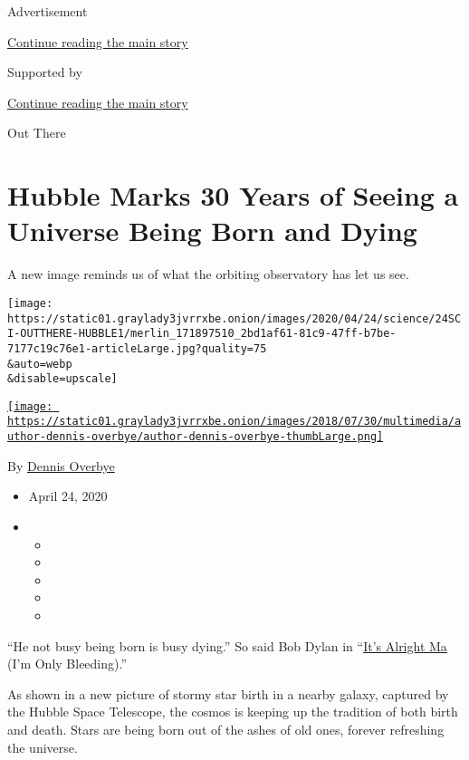 Advertisement

\protect\hyperlink{after-top}{Continue reading the main story}

Supported by

\protect\hyperlink{after-sponsor}{Continue reading the main story}

Out There

\hypertarget{hubble-marks-30-years-of-seeing-a-universe-being-born-and-dying}{%
\section{Hubble Marks 30 Years of Seeing a Universe Being Born and
Dying}\label{hubble-marks-30-years-of-seeing-a-universe-being-born-and-dying}}

A new image reminds us of what the orbiting observatory has let us see.

\texttt{[image: https://static01.graylady3jvrrxbe.onion/images/2020/04/24/science/24SCI-OUTTHERE-HUBBLE1/merlin\_171897510\_2bd1af61-81c9-47ff-b7be-7177c19c76e1-articleLarge.jpg?quality=75\\\&auto=webp\\\&disable=upscale]}

\href{https://www.nytimes3xbfgragh.onion/by/dennis-overbye}{\texttt{[image: https://static01.graylady3jvrrxbe.onion/images/2018/07/30/multimedia/author-dennis-overbye/author-dennis-overbye-thumbLarge.png]}}

By \href{https://www.nytimes3xbfgragh.onion/by/dennis-overbye}{Dennis
Overbye}

\begin{itemize}
\item
  April 24, 2020
\item
  \begin{itemize}
  \item
  \item
  \item
  \item
  \item
  \end{itemize}
\end{itemize}

``He not busy being born is busy dying.'' So said Bob Dylan in
``\href{https://www.youtube.com/watch?v=_CJHbfkROow}{It's Alright Ma}
(I'm Only Bleeding).''

As shown in a new picture of stormy star birth in a nearby galaxy,
captured by the Hubble Space Telescope, the cosmos is keeping up the
tradition of both birth and death. Stars are being born out of the ashes
of old ones, forever refreshing the universe.

